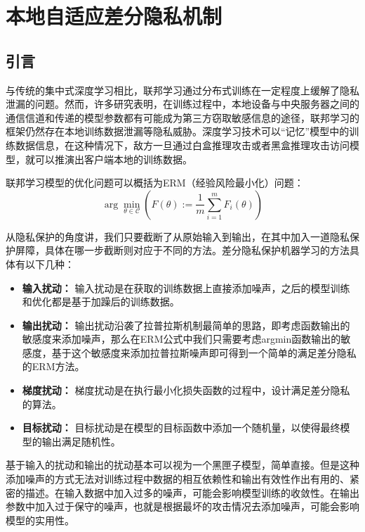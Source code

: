 \chapter{本地自适应差分隐私机制}

\label{ch3}

\section{引言}
与传统的集中式深度学习相比，联邦学习通过分布式训练在一定程度上缓解了隐私泄漏的问题。然而，许多研究表明，在训练过程中，本地设备与中央服务器之间的通信信道和传递的模型参数都有可能成为第三方窃取敏感信息的途径，联邦学习的框架仍然存在本地训练数据泄漏等隐私威胁。深度学习技术可以“记忆”模型中的训练数据信息，在这种情况下，敌方一旦通过白盒推理攻击或者黑盒推理攻击访问模型，就可以推演出客户端本地的训练数据。

联邦学习模型的优化问题可以概括为ERM（经验风险最小化）问题：
\begin{equation}\label{eq:ERM}
\arg \min _{\theta \in \mathcal{C}}\left(F(\theta):=\frac{1}{m} \sum_{i=1}^{m} F_{i}(\theta)\right)
\end{equation}

从隐私保护的角度讲，我们只要截断了从原始输入到输出，在其中加入一道隐私保护屏障，具体在哪一步截断则对应于不同的方法。差分隐私保护机器学习的方法具体有以下几种：
\begin{itemize}
	\item \textbf{输入扰动：} 输入扰动是在获取的训练数据上直接添加噪声，之后的模型训练和优化都是基于加躁后的训练数据。
	\item \textbf{输出扰动：} 输出扰动沿袭了拉普拉斯机制最简单的思路，即考虑函数输出的敏感度来添加噪声，那么在ERM公式中我们只需要考虑argmin函数输出的敏感度，基于这个敏感度来添加拉普拉斯噪声即可得到一个简单的满足差分隐私的ERM方法。
	\item \textbf{梯度扰动：} 梯度扰动是在执行最小化损失函数的过程中，设计满足差分隐私的算法。
	\item \textbf{目标扰动：} 目标扰动是在模型的目标函数中添加一个随机量，以使得最终模型的输出满足随机性。
\end{itemize}

基于输入的扰动和输出的扰动基本可以视为一个黑匣子模型，简单直接。但是这种添加噪声的方式无法对训练过程中数据的相互依赖性和输出有效性作出有用的、紧密的描述。在输入数据中加入过多的噪声，可能会影响模型训练的收敛性。在输出参数中加入过于保守的噪声，也就是根据最坏的攻击情况去添加噪声，可能会影响模型的实用性。

